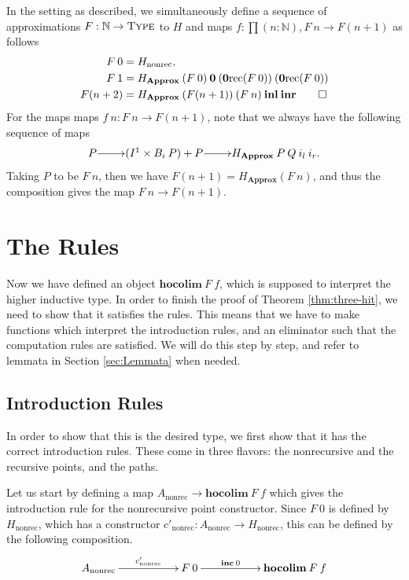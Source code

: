 \documentclass[a4paper,UKenglish]{lipics-v2016}
\newcommand{\Boperator}[1]{\mathrm{\mathbf{#1}}}
\newcommand{\zero}[0]{\textbf{0}}
\newcommand{\frec}[0]{\!\operatorname{rec}}
\newcommand{\nonrec}[0]{\operatorname{nonrec}}
\newcommand{\Approx}[0]{\textbf{Approx}}
\newcommand{\hocolim}[0]{\Boperator{hocolim}}
\newcommand{\inl}[0]{\Boperator{inl}}
\newcommand{\inr}[0]{\Boperator{inr}}
\newcommand{\inc}[0]{\Boperator{inc}}
\newcommand{\Type}[0]{\operatorname{\textsc{Type}}}
\begin{document}
\begin{definition}
In the setting as described, we simultaneously define a sequence of approximations $F : \mathbb{N} \rightarrow \Type$ to $H$ and maps $f : \prod(n : \mathbb{N}), F \> n \rightarrow F(n+1)$ as follows
\begin{align*}
F \> 0 &= H_{\nonrec},\\
F \> 1 &= H_{\Approx} \> (F \> 0) \> \zero \> (\zero\frec (F \> 0)) \> (\zero\frec (F \> 0))\\
F(n+2) &= H_{\Approx} \> (F(n+1)) \> (F \> n) \> \inl \> \inr \qedhere
\end{align*}
For the maps maps $f \> n : F \> n \rightarrow F(n + 1)$, note that we always have the following sequence of maps
\[
\xymatrix@1
{
	P \ar[r] & (I^1 \times B_i \> P) + P \ar[r] & H_{\Approx} \> P \> Q \> i_l \> i_r.
}
\]
Taking $P$ to be $F \> n$, then we have $F (n+1) = H_{\Approx} (F \> n)$, and thus the composition gives the map $F \> n \rightarrow F(n + 1)$.
\end{definition}

\section{The Rules}
\label{sec:rules}
Now we have defined an object $\hocolim \> F \> f$, which is supposed to interpret the higher inductive type.
In order to finish the proof of Theorem \ref{thm:three-hit}, we need to show that it satisfies the rules.
This means that we have to make functions which interpret the introduction rules, and an eliminator such that the computation rules are satisfied.
We will do this step by step, and refer to lemmata in Section \ref{sec:Lemmata} when needed.

\subsection{Introduction Rules}
In order to show that this is the desired type, we first show that it has the correct introduction rules.
These come in three flavors: the nonrecursive and the recursive points, and the paths.

Let us start by defining a map $A_{\nonrec} \rightarrow \hocolim \> F \> f$ which gives the introduction rule for the nonrecursive point constructor.
Since $F \> 0$ is defined by $H_{\nonrec}$, which has a constructor $c'_{\nonrec} : A_{\nonrec} \rightarrow H_{\nonrec}$, this can be defined by the following composition.
\[
\xymatrix
{
	A_{\nonrec} \ar[rr]^-{c'_{\nonrec}}
		& & F \> 0 \ar[rr]^-{\inc \> 0}
		& & \hocolim \> F \> f
}
\]
\end{document}
